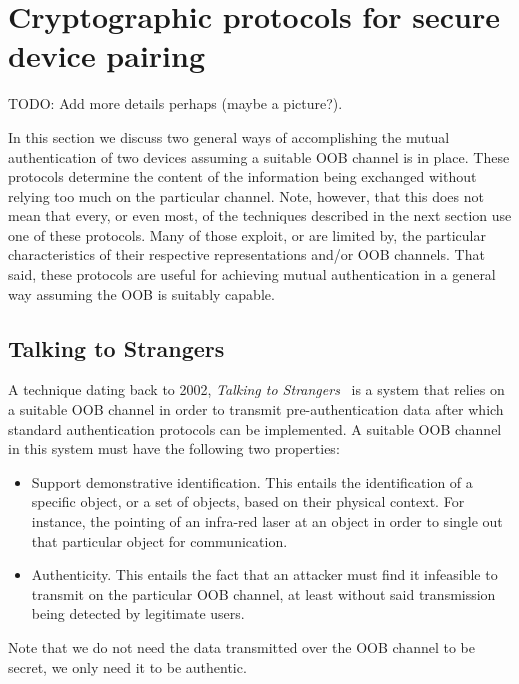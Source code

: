 \documentclass[conference, 11pt]{sty/IEEEtran}
\begin{document}
\section{Cryptographic protocols for secure device pairing}
\label{sec:cryptographic_protocols_for_secure_device_pairing}

TODO: Add more details perhaps (maybe a picture?).

In this section we discuss two general ways of accomplishing the mutual authentication of two devices assuming a suitable OOB channel is in place.
These protocols determine the content of the information being exchanged without relying too much on the particular channel.
Note, however, that this does not mean that every, or even most, of the techniques described in the next section use one of these protocols.
Many of those exploit, or are limited by, the particular characteristics of their respective representations and/or OOB channels.
That said, these protocols are useful for achieving mutual authentication in a general way assuming the OOB is suitably capable.

\subsection{Talking to Strangers}
\label{ssec:talking_to_strangers}

A technique dating back to 2002, \emph{Talking to Strangers}~\cite{balfanz2002talking} is a system that relies on a suitable OOB channel in order to transmit pre-authentication data after which standard authentication protocols can be implemented.
A suitable OOB channel in this system must have the following two properties:

\begin{itemize}
    \item Support demonstrative identification.
        This entails the identification of a specific object, or a set of objects, based on their physical context.
        For instance, the pointing of an infra-red laser at an object in order to single out that particular object for communication.
    \item Authenticity.
        This entails the fact that an attacker must find it infeasible to transmit on the particular OOB channel, at least without said transmission being detected by legitimate users.
\end{itemize}

Note that we do not need the data transmitted over the OOB channel to be secret, we only need it to be authentic.
\end{document}
